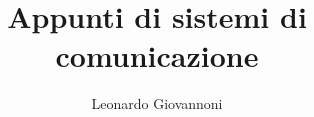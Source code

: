 \documentclass{article}
\title{Appunti di sistemi di comunicazione}
\author{Leonardo Giovannoni}
\begin{document}
\renewcommand{\proofname}{Dimostrazione}

\maketitle



 




\end{document}

